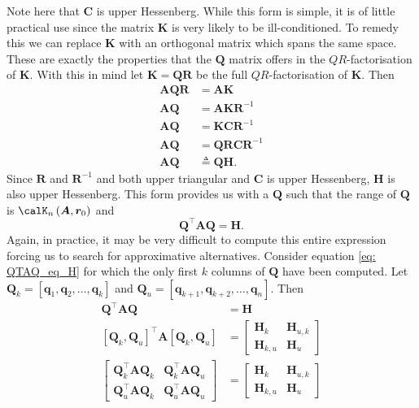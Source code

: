 Note here that $\bm{C}$ is upper Hessenberg. While this form is simple, it is of little practical use since the matrix $\bm{K}$ is very likely to be ill-conditioned. To remedy this we can replace $\bm{K}$ with an orthogonal matrix which spans the same space. These are exactly the properties that the $\bm{Q}$ matrix offers in the $QR$-factorisation of $\bm{K}$. With this in mind let $\bm{K} = \bm{Q} \bm{R}$ be the full $QR$-factorisation of $\bm{K}$. Then
\begin{align*}
    \bm{A} \bm{Q} \bm{R} & = \bm{A} \bm{K}                    \\
    \bm{A} \bm{Q}        & = \bm{A} \bm{K} \bm{R}^{-1}        \\
    \bm{A} \bm{Q}        & = \bm{K} \bm{C} \bm{R}^{-1}        \\
    \bm{A} \bm{Q}        & = \bm{Q} \bm{R} \bm{C} \bm{R}^{-1} \\
    \bm{A} \bm{Q}        & \triangleq \bm{Q} \bm{H}.
\end{align*}
Since $\bm{R}$ and $\bm{R}^{-1}$ and both upper triangular and $\bm{C}$ is upper Hessenberg, $\bm{H}$ is also upper Hessenberg. This form provides us with a $\bm{Q}$ such that the range of $\bm{Q}$ is $\calK_{n} \left( \bm{A}, \bm{r}_0 \right)$ and
\begin{equation}\label{eq: QTAQ_eq_H}
    \bm{Q}^{\intercal} \bm{A} \bm{Q} = \bm{H}.
\end{equation}
Again, in practice, it may be very difficult to compute this entire expression forcing us to search for approximative alternatives. Consider equation \ref{eq: QTAQ_eq_H} for which the only first $k$ columns of $\bm{Q}$ have been computed. Let $\bm{Q}_k = \left[ \bm{q}_1 , \bm{q}_2 , \ldots , \bm{q}_k \right]$ and $\bm{Q}_u = \left[ \bm{q}_{k+1} , \bm{q}_{k+2} , \ldots , \bm{q}_{n} \right]$. Then
\begin{align*}
    \bm{Q}^{\intercal} \bm{A} \bm{Q}                                                         & = \bm{H} \\
    \left[ \bm{Q}_k , \bm{Q}_u \right]^{\intercal} \bm{A} \left[ \bm{Q}_k , \bm{Q}_u \right] & =
    \begin{bmatrix}
        \bm{H}_k     & \bm{H}_{u,k} \\
        \bm{H}_{k,u} & \bm{H}_{u}
    \end{bmatrix}                                                                           \\
    \begin{bmatrix}
        \bm{Q}_{k}^{\intercal} \bm{A} \bm{Q}_{k} & \bm{Q}_{k}^{\intercal} \bm{A} \bm{Q}_{u} \\
        \bm{Q}_{u}^{\intercal} \bm{A} \bm{Q}_{k} & \bm{Q}_{u}^{\intercal} \bm{A} \bm{Q}_{u}
    \end{bmatrix}
                                                                                             & =
    \begin{bmatrix}
        \bm{H}_k     & \bm{H}_{u,k} \\
        \bm{H}_{k,u} & \bm{H}_{u}
    \end{bmatrix}
\end{align*}
